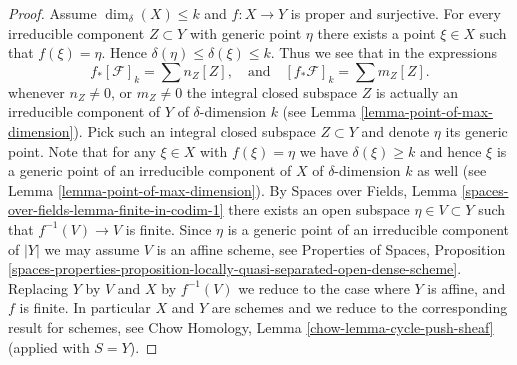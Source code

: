 \documentclass[10pt,a4paper]{amsart}
\theoremstyle{plain}
\theoremstyle{definition}
\theoremstyle{remark}
\numberwithin{equation}{subsection}
\begin{document}
\begin{proof}
\medskip\noindent
Assume $\dim_\delta(X) \leq k$ and $f : X \to Y$ is proper and surjective.
For every irreducible component $Z \subset Y$
with generic point $\eta$ there exists a point $\xi \in X$ such
that $f(\xi) = \eta$. Hence $\delta(\eta) \leq \delta(\xi) \leq k$.
Thus we see that in the expressions
$$
f_*[\mathcal{F}]_k = \sum n_Z[Z],
\quad
\text{and}
\quad
[f_*\mathcal{F}]_k = \sum m_Z[Z].
$$
whenever $n_Z \not = 0$, or $m_Z \not = 0$ the integral closed
subspace $Z$ is actually an irreducible component of $Y$ of
$\delta$-dimension $k$ (see Lemma \ref{lemma-point-of-max-dimension}).
Pick such an integral closed subspace $Z \subset Y$ and denote $\eta$
its generic point.
Note that for any $\xi \in X$ with $f(\xi) = \eta$ we have $\delta(\xi) \geq k$
and hence $\xi$ is a generic point of an irreducible component
of $X$ of $\delta$-dimension $k$ as well
(see Lemma \ref{lemma-point-of-max-dimension}).
By Spaces over Fields, Lemma \ref{spaces-over-fields-lemma-finite-in-codim-1}
there exists an open subspace $\eta \in V \subset Y$
such that $f^{-1}(V) \to V$ is finite.
Since $\eta$ is a generic point of an irreducible component of
$|Y|$ we may assume $V$ is an affine scheme, see
Properties of Spaces, Proposition
\ref{spaces-properties-proposition-locally-quasi-separated-open-dense-scheme}.
Replacing $Y$ by $V$ and $X$ by $f^{-1}(V)$ we reduce to the
case where $Y$ is affine, and $f$ is finite.
In particular $X$ and $Y$ are schemes and we reduce to
the corresponding result for schemes, see
Chow Homology, Lemma \ref{chow-lemma-cycle-push-sheaf}
(applied with $S = Y$).
\end{proof}
\end{document}
